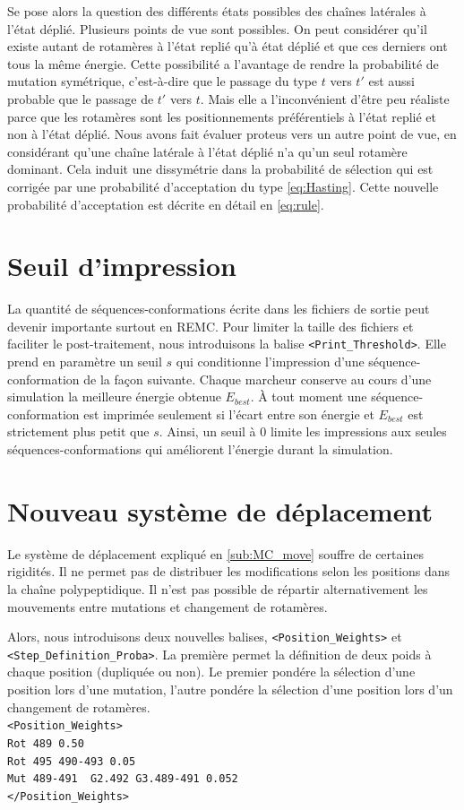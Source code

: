    Se pose alors la question des différents états possibles des chaînes latérales à l'état déplié. Plusieurs points de vue sont possibles. On peut considérer qu'il existe autant de rotamères à l'état replié qu'à état déplié et que ces derniers ont tous la même énergie. Cette possibilité a l'avantage de rendre la probabilité de mutation symétrique, c'est-à-dire que le passage du type $t$ vers $t'$ est aussi probable que le passage de $t'$ vers $t$. Mais elle a l'inconvénient d'être peu réaliste parce que les rotamères sont les positionnements préférentiels à l'état replié et non à l'état déplié. Nous avons fait évaluer proteus vers un autre point de vue, en considérant qu'une chaîne latérale à l'état déplié n'a qu'un seul rotamère dominant. Cela induit une dissymétrie dans la probabilité de sélection qui est corrigée par une probabilité d'acceptation du type \ref{eq:Hasting}. Cette nouvelle probabilité d'acceptation est décrite en détail en \ref{eq:rule}.

   \section{Seuil d'impression}
\label{sec:dev}
La quantité de séquences-conformations écrite dans les fichiers de sortie peut devenir importante surtout en REMC. Pour limiter la taille des fichiers et faciliter le post-traitement, nous introduisons la balise \verb!<Print_Threshold>!. Elle prend en paramètre un seuil $s$ qui conditionne l'impression d'une séquence-conformation de la façon suivante. Chaque marcheur conserve au cours d'une simulation la meilleure énergie obtenue $E_{best}$. À tout moment une séquence-conformation est imprimée seulement si l'écart entre son énergie et $E_{best}$  est strictement plus petit que $s$. Ainsi, un seuil à $0$ limite les impressions aux seules séquences-conformations qui améliorent l'énergie durant la simulation.

\section{Nouveau système de déplacement}

Le système de déplacement expliqué en \ref{sub:MC_move}  souffre de certaines rigidités. Il ne permet pas de distribuer les modifications selon les positions dans la chaîne polypeptidique. Il n'est pas possible de répartir alternativement les mouvements entre mutations et changement de rotamères.

Alors, nous introduisons deux nouvelles balises, \verb!<Position_Weights>!  et \verb!<Step_Definition_Proba>!. La première permet la définition de deux poids à chaque position (dupliquée ou non). Le premier pondére la sélection d'une position lors d'une mutation, l'autre pondére la sélection d'une position lors d'un changement de rotamères.\\
\verb!<Position_Weights>! \\
\verb!Rot 489 0.50 ! \\
\verb!Rot 495 490-493 0.05 ! \\
\verb!Mut 489-491  G2.492 G3.489-491 0.052 ! \\
\verb!</Position_Weights>! \\

